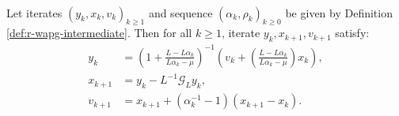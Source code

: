 \documentclass[12pt]{article}
\begin{document}
        \begin{proposition}\label{prop:wagp-st-form}\;\\
            Let iterates $(y_k, x_{k}, v_{k})_{k \ge 1}$ and sequence $(\alpha_k, \rho_k)_{k \ge 0}$ be given by Definition \ref{def:r-wapg-intermediate}. 
            Then for all $k \ge 1$, iterate $y_k, x_{k + 1}, v_{k + 1}$
            satisfy: 
            \begin{align*}
                y_{k} &= 
                \left(
                    1 + \frac{L - L\alpha_{k}}{L\alpha_{k} - \mu}
                \right)^{-1}
                \left(
                    v_{k} + 
                    \left(\frac{L - L\alpha_{k}}{L\alpha_{k} - \mu} \right) x_{k}
                \right), 
                \\
                x_{k + 1} &= 
                y_k - L^{-1} \mathcal G_L y_k, 
                \\
                v_{k + 1} &= x_{k + 1} + (\alpha_k^{-1} - 1)(x_{k + 1} - x_k). 
            \end{align*}
        \end{proposition}
\end{document}
